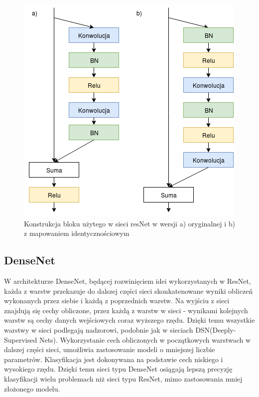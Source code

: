 \documentclass[a4paper,11pt,twoside]{report}
\theoremstyle{definition}
\begin{document}
\begin{figure}[h!]
	\centering
	\includegraphics[scale=0.7]{resnetBlock}
	\caption{Konstrukcja bloku użytego w sieci resNet w wersji a) oryginalnej i b) z mapowaniem identycznościowym}
	\label{fig:resnetBlock}
\end{figure}

\subsection{DenseNet}

W architekturze DenseNet, będącej rozwinięciem idei wykorzystanych w ResNet, każda z warstw przekazuje do dalszej części sieci skonkatenowane wyniki obliczeń wykonanych przez siebie i każdą z poprzednich warstw. Na wyjściu z sieci znajdują się cechy obliczone, przez każdą z warstw w sieci - wynikami kolejnych warstw są cechy danych wejściowych coraz wyższego rzędu. Dzięki temu wszystkie warstwy w sieci podlegają nadzorowi, podobnie jak w sieciach DSN(Deeply-Supervised Nets)\cite{DSN}. Wykorzystanie cech obliczonych w początkowych warstwach w dalszej części sieci, umożliwia zastosowanie modeli o mniejszej liczbie parametrów. Klasyfikacja jest dokonywana na podstawie cech niskiego i wysokiego rzędu. Dzięki temu sieci typu DenseNet osiągają lepszą precyzję klasyfikacji wielu problemach niż sieci typu ResNet, mimo zastosowania mniej złożonego modelu\cite{denseNet}. 
\end{document}
